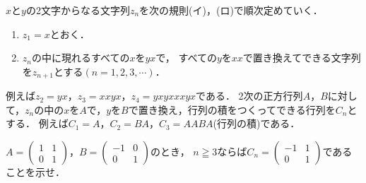 \documentclass[../../main.tex]{subfiles}
\begin{document}
$x$と$y$の2文字からなる文字列$z_n$を次の規則(イ)，(ロ)で順次定めていく．
\begin{enumerate}
  \item[(イ)] $z_1=x$とおく．
  \item[(ロ)] $z_n$の中に現れるすべての$x$を$yx$で，
    すべての$y$を$xx$で置き換えてできる文字列を$z_{n+1}$とする$(n=1,2,3,\cdots)$．
\end{enumerate}
例えば$z_2=yx$，$z_3=xxyx$，$z_4=yxyxxxyx$である．
2次の正方行列$A$，$B$に対して，$z_n$の中の$x$を$A$で，$y$を$B$で置き換え，行列の積をつくってできる行列を$C_n$とする．
例えば$C_1=A$，$C_2=BA$，$C_3=AABA$(行列の積)である．

$A=
\begin{pmatrix} 1 & 1 \\ 0 & 1
\end{pmatrix}$，$B=
\begin{pmatrix} -1 & 0 \\ 0 & 1
\end{pmatrix}$のとき，
$n\geqq3$ならば$C_n=
\begin{pmatrix} -1 & 1 \\ 0 & 1
\end{pmatrix}$であることを示せ．
\end{document}
